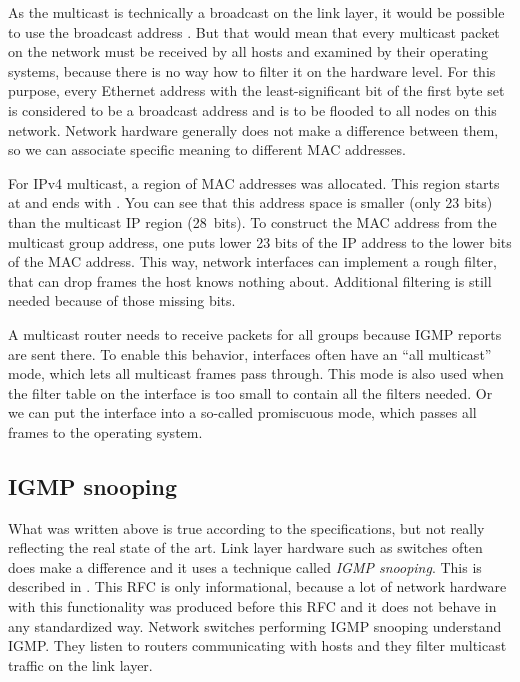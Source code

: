 As the multicast is technically a broadcast on the link layer, it would be possible to
use the broadcast address .
But that would mean that every multicast packet on the network must be received by all
hosts and examined by their operating systems, because there is no way how to filter
it on the hardware level. For this purpose, every Ethernet address with the
least-significant bit of the first byte set is considered to be
a broadcast address and is to be flooded to all nodes on this network. Network
hardware generally does not make a difference between them, so we can associate
specific meaning to different MAC addresses.

For IPv4 multicast, a region of MAC addresses was allocated. This region starts
at  and ends with . You can see
that this address space is smaller (only 23 bits) than the multicast IP region
(28~bits). To construct the MAC address from the multicast group address, one
puts lower 23 bits of the IP address to the lower bits of the MAC address. This
way, network interfaces can implement a rough filter, that can drop frames the
host knows nothing about. Additional filtering is still needed because of those
missing bits.

A multicast router needs to receive packets for all groups because IGMP reports
are sent there. To enable this behavior, interfaces often have an ``all multicast''
mode, which lets all multicast frames pass through. This mode is also used when
the filter table on the interface is too small to contain all the filters needed. Or
we can put the interface into a so-called promiscuous mode, which passes all frames
to the operating system.

\subsection{IGMP snooping}

What was written above is true according to the specifications, but not really
reflecting the real state of the art. Link layer hardware such as switches often does
make a difference and it uses a technique called \emph{IGMP snooping}. This is described
in . This RFC is only informational, because a lot of network hardware with
this functionality was produced before this RFC and it does not behave in any
standardized way. Network switches performing IGMP snooping understand IGMP. They
listen to routers communicating with hosts and they filter multicast traffic on
the link layer.

